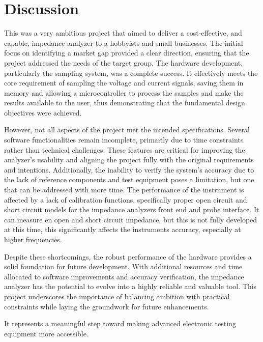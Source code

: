 \chapter{Discussion} \label{ch:Discussion}

This was a very ambitious project that aimed to deliver a cost-effective, and capable, impedance analyzer to a hobbyists and small businesses. The initial focus on identifying a market gap provided a clear direction, ensuring that the project addressed the needs of the target group. The hardware development, particularly the sampling system, was a complete success. It effectively meets the core requirement of sampling the voltage and current signals, saving them in memory and allowing a microcontroller to process the samples and make the results available to the user, thus demonstrating that the fundamental design objectives were achieved.

However, not all aspects of the project met the intended specifications. Several software functionalities remain incomplete, primarily due to time constraints rather than technical challenges. These features are critical for improving the analyzer's usability and aligning the project fully with the original requirements and intentions. Additionally, the inability to verify the system's accuracy due to the lack of reference components and test equipment poses a limitation, but one that can be addressed with more time. The performance of the instrument is affected by a lack of calibration functions, specifically proper open circuit and short circuit models for the impedance analyzers front end and probe interface. It can measure en open and short circuit impedance, but this is not fully developed at this time, this significantly affects the instruments accuracy, especially at higher frequencies.

Despite these shortcomings, the robust performance of the hardware provides a solid foundation for future development. With additional resources and time allocated to software improvements and accuracy verification, the impedance analyzer has the potential to evolve into a highly reliable and valuable tool. This project underscores the importance of balancing ambition with practical constraints while laying the groundwork for future enhancements.


It represents a meaningful step toward making advanced electronic testing equipment more accessible.